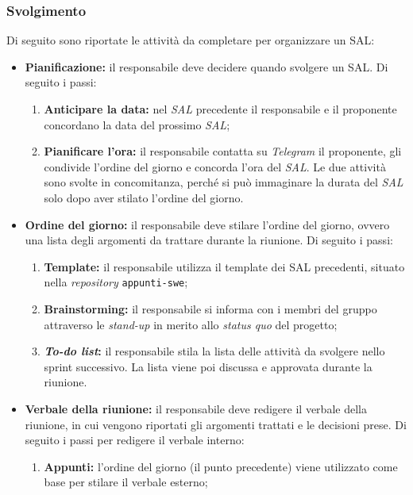 \subsubsection{Svolgimento}
Di seguito sono riportate le attività da completare per organizzare un SAL:

\begin{itemize}

	\item \textbf{Pianificazione:} il responsabile deve decidere quando svolgere
	      un SAL. Di seguito i passi:
	      \begin{enumerate}
		      \item \textbf{Anticipare la data:} nel \textit{SAL}
		            precedente il responsabile e il proponente concordano
		            la data del prossimo \textit{SAL};

		      \item \textbf{Pianificare l'ora:} il responsabile contatta su
		            \textit{Telegram} il proponente, gli condivide l'ordine del
		            giorno e concorda l'ora del \textit{SAL}. Le due attività
		            sono svolte in concomitanza, perché si può immaginare la
		            durata del \textit{SAL} solo dopo aver stilato l'ordine del
		            giorno.
	      \end{enumerate}

	\item \textbf{Ordine del giorno:} il responsabile deve stilare l'ordine del
	      giorno, ovvero una lista degli argomenti da trattare durante la
	      riunione. Di seguito i passi:
	      \begin{enumerate}
		      \item \textbf{Template:} il responsabile utilizza il template
		            dei SAL precedenti, situato nella \textit{repository}
		            \texttt{appunti-swe};

		      \item \textbf{Brainstorming:} il responsabile si informa con i
		            membri del gruppo attraverso le \textit{stand-up} in merito
		            allo \textit{status quo} del progetto;

		      \item \textbf{\textit{To-do list}:} il responsabile stila la lista
		            delle attività da svolgere nello sprint successivo. La
		            lista viene poi discussa e approvata durante la riunione.
	      \end{enumerate}

	\item \textbf{Verbale della riunione:} il responsabile deve redigere il
	      verbale della riunione, in cui vengono riportati gli argomenti
	      trattati e le decisioni prese. Di seguito i passi per redigere il
	      verbale interno:
	      \begin{enumerate}
		      \item \textbf{Appunti:} l'ordine del giorno (il punto precedente)
		            viene utilizzato come base per stilare il verbale esterno;


\end{enumerate}
\end{itemize}
